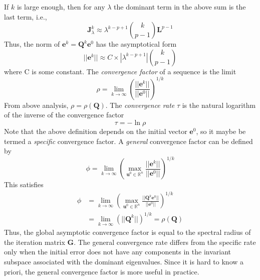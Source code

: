 If $k$ is large enough, then for any $\lambda$ the dominant term in the above sum is the last term, i.e.,
\begin{equation}
    \boldsymbol{J}_\lambda^k \approx \lambda^{k-p+1}{k \choose p-1}\boldsymbol{L}^{p-1}
\end{equation}
Thus, the norm of $\boldsymbol{e}^k = \boldsymbol{Q}^k\boldsymbol{e}^0$ has the asymptotical form
\begin{equation}
    ||\boldsymbol{e}^k|| \approx C \times |\lambda^{k-p+1}|{k \choose p-1}
\end{equation}
where C is some constant. The \textit{convergence factor} of a sequence is the limit
\begin{equation}
    \rho = \lim_{k\to\infty}(\frac{||\boldsymbol{e}^k||}{||\boldsymbol{e}^0||})^{1/k}
\end{equation}
From above analysis, $\rho = \rho(\boldsymbol{Q})$. The \textit{convergence rate} $\tau$ is the natural logarithm of the inverse of the convergence factor
\begin{equation}
    \tau = - \ln \rho
\end{equation}
Note that the above definition depends on the initial vector $\boldsymbol{e}^0$, so it maybe be termed a \textit{specific} convergence factor. A \textit{general} convergence factor can be defined by
\begin{equation}
    \phi = \lim_{k\to\infty}(\max_{\boldsymbol{u}^0\in\mathbb{R}^n}\frac{||\boldsymbol{e}^k||}{||\boldsymbol{e}^0||})^{1/k}
\end{equation}
This satisfies
\begin{align}
\phi &= \lim_{k\to\infty}(\max_{\boldsymbol{u}^0\in\mathbb{R}^n}\frac{||\boldsymbol{Q}^k\boldsymbol{e}^0||}{||\boldsymbol{e}^0||})^{1/k} \\
&= \lim_{k\to\infty}(||\boldsymbol{Q}^k||)^{1/k} = \rho(\boldsymbol{Q})
\end{align}
Thus, the global asymptotic convergence factor is equal to the spectral radius of the iteration matrix $\boldsymbol{G}$. The general convergence rate differs from the specific rate only when the initial error does not have any components in the invariant subspace associated with the dominant eigenvalues. Since it is hard to know a priori, the general convergence factor is more useful in practice.

